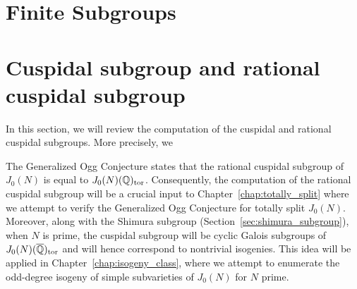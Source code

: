 
\section{Finite Subgroups}%
\label{sec:finite_subgroups}
\section{Cuspidal subgroup and rational cuspidal subgroup}%
\label{sec:cuspidal_subgroup}

In this section, we will review the computation of the cuspidal and rational
cuspidal subgroups. More precisely, we %

The Generalized Ogg Conjecture states that the rational
cuspidal subgroup of $J_0(N)$ is equal to $J_0(N)(\mathbb{Q})_{\mathrm{tor}}$. Consequently, the
computation of the rational cuspidal subgroup will be a crucial input to
Chapter~\ref{chap:totally_split} where we attempt to verify the Generalized Ogg
Conjecture for totally split $J_0(N)$. Moreover, along with the Shimura
subgroup (Section~\ref{sec:shimura_subgroup}), when $N$ is prime, the cuspidal
subgroup will be cyclic Galois subgroups of $J_0(N)(\overline{\mathbb{Q}})_{\mathrm{tor}}$ and will
hence correspond to nontrivial isogenies. This idea will be applied in
Chapter~\ref{chap:isogeny_class}, where we attempt to enumerate the odd-degree
isogeny of simple subvarieties of $J_0(N)$ for $N$ prime.

